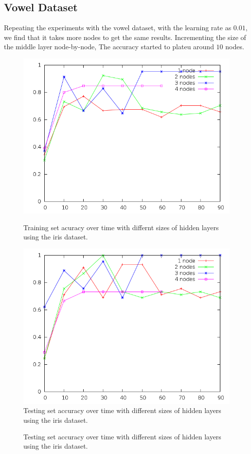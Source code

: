 \documentclass[12pt]{article}
\begin{document}
\subsection{Vowel Dataset}
Repeating the experiments with the vowel dataset, with the learning rate as
$0.01$, we find that it takes more nodes to get the same results. Incrementing
the size of the middle layer node-by-node, The accuracy started to plateu
around $10$ nodes.

\begin{figure}[!ht]
    \centering
    \begin{minipage}[b]{0.45\linewidth}
        \includegraphics[width=1.0\textwidth]{iris-hiddennodes-training}
        \caption{Training set acuracy over time with differnt sizes of hidden layers using the iris dataset.}
      \label{fig:iris_hiddennodes_training}
  \end{minipage}
  \quad
    \begin{minipage}[b]{0.45\linewidth}
        \includegraphics[width=1.0\textwidth]{iris-hiddennodes-testing}
    \caption{Testing set accuracy over time with different sizes of hidden layers using the iris dataset.}
      \label{fig:iris_hiddennodes_testing}
  \end{minipage}
\end{figure}

\begin{figure}[!ht]
    \begin{center}
    \end{center}
    \caption{Testing set accuracy over time with different sizes of hidden layers using the iris dataset.}
  \label{fig:iris_hiddennodes_testing}
\end{figure}
\end{document}

